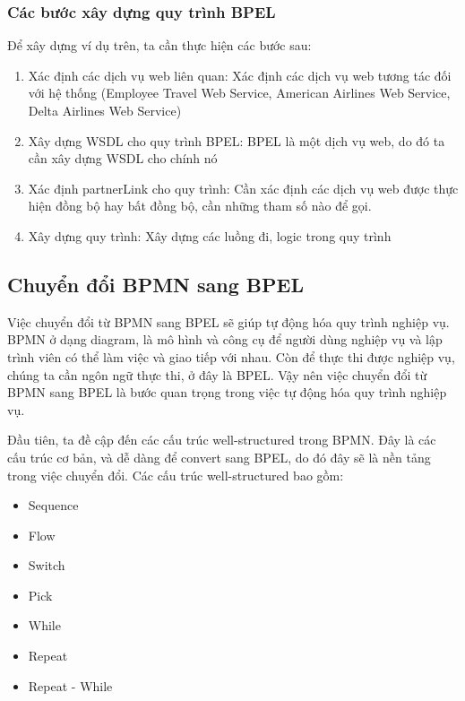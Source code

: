 \subsubsection{Các bước xây dựng quy trình BPEL}
Để xây dựng ví dụ trên, ta cần thực hiện các bước sau:
\begin{enumerate}
	\item Xác định các dịch vụ web liên quan: Xác định các dịch vụ web tương tác đối với hệ thống (Employee Travel Web Service, American Airlines Web Service, Delta Airlines Web Service)
	\item Xây dựng WSDL cho quy trình BPEL: BPEL là một dịch vụ web, do đó ta cần xây dựng WSDL cho chính nó
	\item Xác định partnerLink cho quy trình: Cần xác định các dịch vụ web được thực hiện đồng bộ hay bất đồng bộ, cần những tham số nào để gọi.
	\item Xây dựng quy trình: Xây dựng các luồng đi, logic trong quy trình
\end{enumerate} 



\subsection{Chuyển đổi BPMN sang BPEL}
\par Việc chuyển đổi từ BPMN sang BPEL sẽ giúp tự động hóa quy trình nghiệp vụ. BPMN ở dạng diagram, là mô hình và công cụ để người dùng nghiệp vụ và lập trình viên có thể làm việc và giao tiếp với nhau. 
Còn để thực thi được nghiệp vụ, chúng ta cần ngôn ngữ thực thi, ở đây là BPEL. Vậy nên việc chuyển đổi từ BPMN sang BPEL là bước quan trọng trong việc tự động hóa quy trình nghiệp vụ.

\par Đầu tiên, ta đề cập đến các cấu trúc well-structured trong BPMN. Đây là các cấu trúc cơ bản, và dễ dàng để convert sang BPEL, do đó đây sẽ là nền tảng trong việc chuyển đổi. Các cấu trúc well-structured bao gồm:
\begin{itemize}
	\item Sequence
	\item Flow
	\item Switch
	\item Pick
	\item While
	\item Repeat
	\item Repeat - While
\end{itemize}

